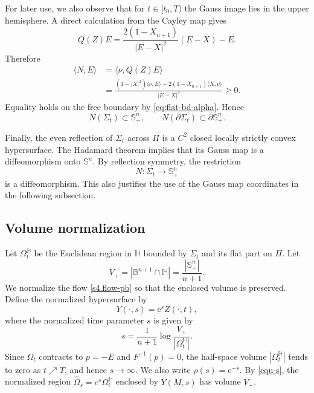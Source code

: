 \documentclass[11pt, reqno]{amsart}
\theoremstyle{remark}
\theoremstyle{definition}
\numberwithin{equation}{section}
\newcommand{\Sph}{\mathbb S}
\newcommand{\B}{\mathbb B}
\newcommand{\HH}{\mathbb H}
\newcommand{\PiH}{\Pi}
\begin{document}
For later use, we also observe that for $t\in [t_0,T)$ the Gauss image lies in the
upper hemisphere. A direct calculation from the Cayley map gives
\begin{equation*}
 Q(Z)E
 =
 \frac{2(1-X_{n+1})}{|E-X|^2}(E-X)-E.
\end{equation*}
Therefore
\begin{align*}
 \langle N,E\rangle
 &=
 \langle\nu,Q(Z)E\rangle \\
 &=
 \frac{
 (1-|X|^2)\langle\nu,E\rangle
 -
 2(1-X_{n+1})\langle X,\nu\rangle
 }{|E-X|^2}
 \geq0.
\end{align*}
Equality holds on the free boundary by \eqref{eq:flat-bd-alpha}. Hence
\begin{equation*}
 N(\Sigma_t)\subset\mathbb S^n_+,
 \qquad
 N(\partial\Sigma_t)\subset\partial\mathbb S^n_+.
\end{equation*}

Finally, the even reflection of $\Sigma_t$ across $\Pi$ is a
$C^2$ closed locally strictly convex hypersurface. The Hadamard
theorem implies that its Gauss map is a diffeomorphism onto
$\mathbb S^n$. By reflection symmetry, the restriction
\begin{equation*}
 N:\Sigma_t\longrightarrow\mathbb S^n_+
\end{equation*}
is a diffeomorphism. This also justifies the use of the Gauss map
coordinates in the following subsection.

\subsection{Volume normalization}
\label{sec:normalization-alpha}

Let $\Omega_t^{\HH}$ be the Euclidean region in $\HH$ bounded by $\Sigma_t$
and its flat part on $\PiH$. Let
\begin{equation*}
        V_+=|\B^{n+1}\cap\HH|=\frac{|\Sph^n_+|}{n+1}.
\end{equation*}
We normalize the flow \eqref{s4.flow-pb} so that the enclosed volume is preserved.  Define the normalized hypersurface by
\begin{equation*}
        Y(\cdot,s)=\mathrm{e}^s Z(\cdot,t),
\end{equation*}
where the normalized time parameter $s$ is given by
\begin{equation}
    \label{equ-s}
	s = \dfrac{1}{n+1}\log \dfrac{V_+}{|\Omega_t^{\mathbb{H}}|}.
\end{equation}
Since $\Omega_t$ contracts to $p=-E$ and $F^{-1}(p)=0$, the half-space volume $|\Omega_t^{\mathbb{H}}|$ tends to zero as $t\nearrow T$, and hence $s\to\infty$.  We also write $\rho(s)=\mathrm{e}^{-s}$.  By \eqref{equ-s}, the normalized region $\widehat\Omega_s=e^s\Omega_t^{\mathbb{H}}$ enclosed by $Y(M,s)$ has volume $V_+$.
\end{document}
